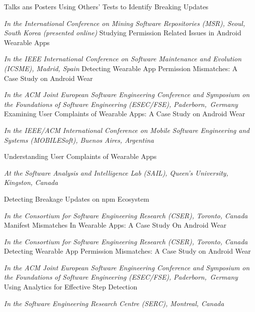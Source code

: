 
\begin{rubric}{Talks ans Posters}
    \entry*[May 2020] Using Others' Tests to Identify Breaking Updates
    \par \textit{In the International Conference on Mining Software Repositories (MSR), Seoul, South Korea (presented online)}
    \entry*[Sep 2018] Studying Permission Related Issues in Android Wearable Apps
    \par \textit{In the IEEE International Conference on Software Maintenance and Evolution (ICSME), Madrid, Spain}
    \entry*[Sep 2017] Detecting Wearable App Permission Mismatches: A Case Study on Android Wear
    \par \textit{In the ACM Joint European Software Engineering Conference  and Symposium on the Foundations of Software Engineering (ESEC/FSE), Paderborn,~Germany}
    \entry*[May 2017] Examining User Complaints of Wearable Apps: A Case Study on Android Wear
    \par \textit{In the IEEE/ACM International Conference on Mobile Software Engineering and Systems (MOBILESoft), Buenos Aires, Argentina}

    \entry*[Jun 2017] Understanding User Complaints of Wearable Apps
    \par \textit{At the Software Analysis and Intelligence Lab (SAIL), Queen’s University, Kingston, Canada}

    \entry*[Oct 2018] Detecting Breakage Updates on npm Ecosystem
    \par \textit{In the Consortium for Software Engineering Research (CSER), Toronto, Canada}
    \entry*[Oct 2017] Manifest Mismatches In Wearable Apps: A Case Study On Android Wear
    \par \textit{In the Consortium for Software Engineering Research (CSER), Toronto, Canada}
    \entry*[Sep 2017] Detecting Wearable App Permission Mismatches: A Case Study on Android Wear
    \par \textit{In the ACM Joint European Software Engineering Conference  and Symposium on the Foundations of Software Engineering (ESEC/FSE), Paderborn,~Germany}
    \entry*[May 2017] Using Analytics for Effective Step Detection
    \par \textit{In the Software Engineering Research Centre (SERC), Montreal, Canada}    
\end{rubric}
